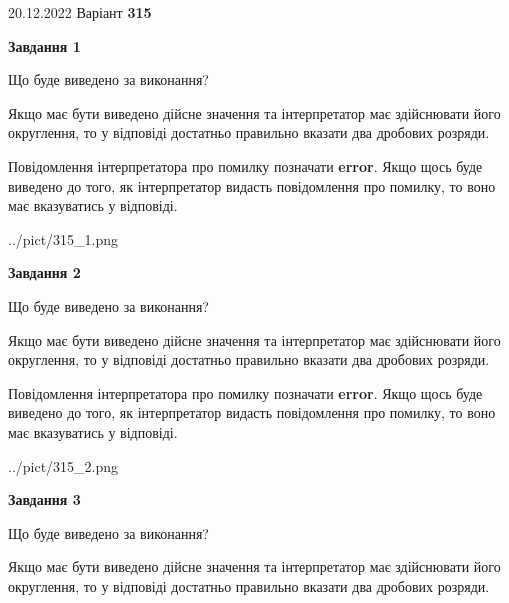\documentclass[12pt, ukrainian]{article}
\begin{document}
{20.12.2022 Варіант \No \textbf { 315 }\par}
{
\begin {Large}

{\begin {center}\textbf{Завдання 1}\end {center}}\par
Що буде виведено за виконання? \par

Якщо має бути виведено дійсне значення та інтерпретатор має здійснювати його округлення, 
то у відповіді достатньо правильно вказати два дробових розряди.

Повідомлення інтерпретатора про помилку позначати \textbf{error}.
Якщо щось буде виведено до того, як інтерпретатор видасть повідомлення про помилку, 
то воно має вказуватись у відповіді. \par

\begin{center}
	{../pict/315_1.png}
\end{center}
\newpage

{\begin {center}\textbf{Завдання 2}\end {center}}\par
Що буде виведено за виконання? \par

Якщо має бути виведено дійсне значення та інтерпретатор має здійснювати його округлення, 
то у відповіді достатньо правильно вказати два дробових розряди.

Повідомлення інтерпретатора про помилку позначати \textbf{error}.
Якщо щось буде виведено до того, як інтерпретатор видасть повідомлення про помилку, 
то воно має вказуватись у відповіді. \par

\begin{center}
	{../pict/315_2.png}
\end{center}
\newpage

{\begin {center}\textbf{Завдання 3}\end {center}}\par
Що буде виведено за виконання? \par

Якщо має бути виведено дійсне значення та інтерпретатор має здійснювати його округлення, 
то у відповіді достатньо правильно вказати два дробових розряди.


\end{Large}}
\end{document}

